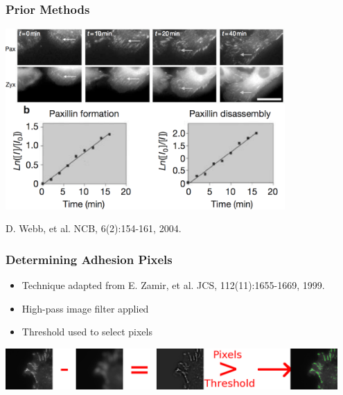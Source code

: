 \documentclass{beamer}
\newcommand{\figref}[1]{\begin{flushright}{\tiny #1 }\end{flushright}}
\begin{document}
\begin{frame}
	\frametitle{Prior Methods}
	\begin{center}
	\includegraphics[width=0.8\textwidth]{figures/finding/prior}
	\end{center}
	\figref{D. Webb, et al. NCB, 6(2):154-161, 2004.}
\end{frame}

\begin{frame}
	\frametitle{Determining Adhesion Pixels}
	 \begin{itemize}
	 \item Technique adapted from E. Zamir, et al. JCS, 112(11):1655-1669, 1999.
	 \item High-pass image filter applied
	 \item Threshold used to select pixels
	 \end{itemize}
	 \bigskip
	 \begin{center}
	 \includegraphics[width=0.95\textwidth]{figures/finding/pixel_id}
	 \end{center}

\end{frame}
\end{document}
